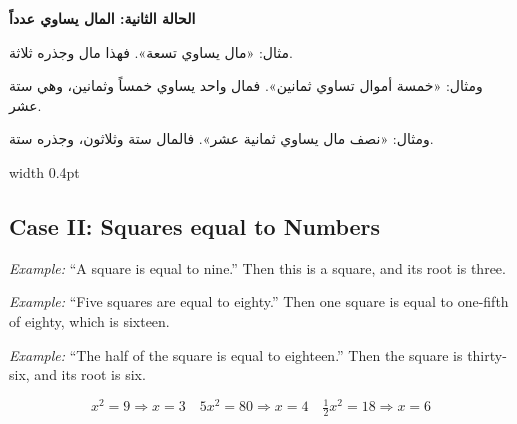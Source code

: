 \documentclass[11pt,a4paper,openany,oneside]{book}
\begin{document}
\vspace{0.5cm}

\noindent\begin{minipage}[t]{0.48\textwidth}
\raggedleft

\begin{Arabic}
\textbf{الحالة الثانية: المال يساوي عدداً}

مثال: «مال يساوي تسعة». فهذا مال وجذره ثلاثة.

ومثال: «خمسة أموال تساوي ثمانين». فمال واحد يساوي خمساً وثمانين، وهي ستة عشر.

ومثال: «نصف مال يساوي ثمانية عشر». فالمال ستة وثلاثون، وجذره ستة.
\end{Arabic}

\end{minipage}%
\hfill\vrule width 0.4pt\hfill
\begin{minipage}[t]{0.48\textwidth}
\raggedright

\subsection*{Case II: Squares equal to Numbers}

\textit{Example:} ``A square is equal to nine.'' Then this is a square, and its root is three.

\textit{Example:} ``Five squares are equal to eighty.'' Then one square is equal to one-fifth of eighty, which is sixteen.

\textit{Example:} ``The half of the square is equal to eighteen.'' Then the square is thirty-six, and its root is six.

\begin{equation}
\boxed{x^2 = 9 \Rightarrow x = 3} \quad
\boxed{5x^2 = 80 \Rightarrow x = 4} \quad
\boxed{\tfrac{1}{2}x^2 = 18 \Rightarrow x = 6}
\end{equation}

\end{minipage}
\vspace{0.3cm}

\vspace{0.5cm}
\end{document}
